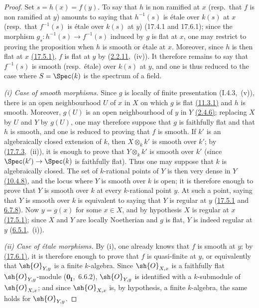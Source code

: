 \begin{proof}
Set $s=h(x)=f(y)$.
To say that $h$ is non ramified at $x$ (resp.\ that $f$ is non ramified at $y$) amounts to saying that $h^{-1}(s)$ is \'etale over $k(s)$ at $x$ (resp.\ that $f^{-1}(s)$ is \'etale over $k(s)$ at $y$) (17.4.1 and 17.6.1); since the morphism $g_s:h^{-1}(s)\to f^{-1}(s)$ induced by $g$ is flat at $x$, one may restrict to proving the proposition when $h$ is smooth or \'etale at $x$.
Moreover, since $h$ is then flat at $x$ {\hyperlink{ega4.c04.thm.17-5-1}{(17.5.1)}}, $f$ is flat at $y$ by ({\hyperlink{ega4.c04.cor.2-2-11}{2.2.11}},~(iv)).
It therefore remains to say that $f^{-1}(s)$ is smooth (resp.\ \'etale) over $k(s)$ at $y$, and one is thus reduced to the case where $S=\Spec(k)$ is the spectrum of a field.

\emph{(i) Case of smooth morphisms.}
Since $g$ is locally of finite presentation (I.4.3,~(v)), there is an open neighbourhood $U$ of $x$ in $X$ on which $g$ is flat {\hyperlink{ega4.c04.thm.11-3-1}{(11.3.1)}} and $h$ is smooth.
Moreover, $g(U)$ is an open neighbourhood of $y$ in $Y$ {\hyperlink{ega4.c04.thm.2-4-6}{(2.4.6)}}; replacing $X$ by $U$ and $Y$ by $g(U)$, one may therefore suppose that $g$ is faithfully flat and that $h$ is smooth, and one is reduced to proving that $f$ is smooth.
If $k'$ is an algebraically closed extension of $k$, then $X\otimes_k k'$ is smooth over $k'$; by ({\hyperlink{ega4.c04.cor.17-7-3}{17.7.3}},~(ii)), it is enough to prove that $Y\otimes_k k'$ is smooth over $k'$ (since $\Spec(k')\to\Spec(k)$ is faithfully flat).
Thus one may suppose that $k$ is algebraically closed.
The set of $k$-rational points of $Y$ is then very dense in $Y$ {\hyperlink{ega4.c04.cor.10-4-8}{(10.4.8)}}, and the locus where $Y$ is smooth over $k$ is open; it is therefore enough to prove that $Y$ is smooth over $k$ at every $k$-rational point $y$.
At such a point, saying that $Y$ is smooth over $k$ is equivalent to saying that $Y$ is regular at $y$ ({\hyperlink{ega4.c04.thm.17-5-1}{17.5.1}} and {\hyperlink{ega4.c04.cor.6-7-8}{6.7.8}}).
Now $y=g(x)$ for some $x\in X$, and by hypothesis $X$ is regular at $x$ {\hyperlink{ega4.c04.thm.17-5-1}{(17.5.1)}}; since $X$ and $Y$ are locally Noetherian and $g$ is flat, $Y$ is indeed regular at $y$ ({\hyperlink{ega4.c04.prop.6-5-1}{6.5.1}},~(i)).


\emph{(ii) Case of \'etale morphisms.}
By (i), one already knows that $f$ is smooth at $y$; by {\hyperlink{ega4.c04.thm.17-6-1}{(17.6.1)}}, it is therefore enough to prove that $f$ is quasi-finite at $y$, or equivalently that $\sh{O}_{Y,y}$ is a finite $k$-algebra.
Since $\sh{O}_{X,x}$ is a faithfully flat $\sh{O}_{Y,y}$-module ($\mathbf{0}_\mathbf{I}$,~6.6.2), $\sh{O}_{Y,y}$ is identified with a $k$-submodule of $\sh{O}_{X,x}$; and since $\sh{O}_{X,x}$ is, by hypothesis, a finite $k$-algebra, the same holds for $\sh{O}_{Y,y}$.
\end{proof}

